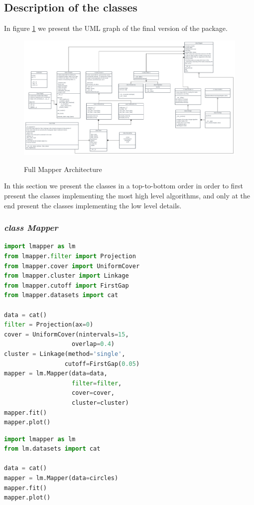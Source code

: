 \subsection{Description of the classes}
In figure \ref{fig:fullmapperarchitecture} we present the UML graph of the final version of the package.
\begin{figure}[h]
	\caption{Full Mapper Architecture}
	\centering
	\includegraphics[width=1\textwidth]{Figs/fullMapperArchitecture.png}
	\label{fig:fullmapperarchitecture}
\end{figure} 
In this section we present the classes in a top-to-bottom order in order to first present the classes implementing the most high level algorithms, and only at the end present the classes implementing the low level details.

\subsubsection{\textit{class Mapper}}
\begin{lstlisting}[language=Python, caption=Example for the Mapper class]
import lmapper as lm
from lmapper.filter import Projection
from lmapper.cover import UniformCover
from lmapper.cluster import Linkage
from lmapper.cutoff import FirstGap
from lmapper.datasets import cat

data = cat()
filter = Projection(ax=0)
cover = UniformCover(nintervals=15,
                   overlap=0.4)
cluster = Linkage(method='single',
                 cutoff=FirstGap(0.05)
mapper = lm.Mapper(data=data,
                   filter=filter,
                   cover=cover,
                   cluster=cluster)
mapper.fit()
mapper.plot()
\end{lstlisting}

\begin{lstlisting}[language=Python, caption=Example 2 for the Mapper class. The Mapper object can be initialized just with the data matrix.]
import lmapper as lm
from lm.datasets import cat

data = cat()
mapper = lm.Mapper(data=circles)
mapper.fit()
mapper.plot()
\end{lstlisting}


